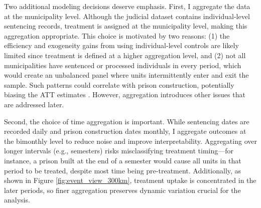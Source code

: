 Two additional modeling decisions deserve emphasis. First, I aggregate the data at the municipality level. Although the judicial dataset contains individual-level sentencing records, treatment is assigned at the municipality level, making this aggregation appropriate. This choice is motivated by two reasons: (1) the efficiency and exogeneity gains from using individual-level controls are likely limited since treatment is defined at a higher aggregation level, and (2) not all municipalities have sentenced or processed individuals in every period, which would create an unbalanced panel where units intermittently enter and exit the sample. Such patterns could correlate with prison construction, potentially biasing the ATT estimates \citep{SantQi, Hong}. However, aggregation introduces other issues that are addressed later.

Second, the choice of time aggregation is important. While sentencing dates are recorded daily and prison construction dates monthly, I aggregate outcomes at the bimonthly level to reduce noise and improve interpretability. Aggregating over longer intervals (e.g., semesters) risks misclassifying treatment timing—for instance, a prison built at the end of a semester would cause all units in that period to be treated, despite most time being pre-treatment. Additionally, as shown in Figure \ref{fig:event_view_300km}, treatment uptake is concentrated in the later periods, so finer aggregation preserves dynamic variation crucial for the analysis.

